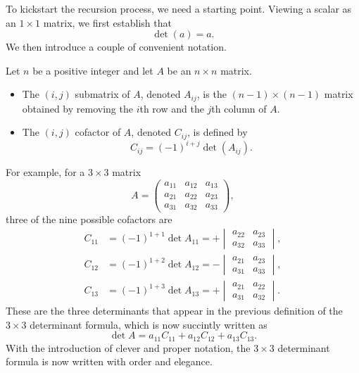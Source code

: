 \documentclass{ximera}
\begin{document}
To kickstart the recursion process, we need a starting point. Viewing
a scalar as an $1 \times 1$ matrix, we first establish that
\[
  \det \left( a \right) = a.
\]
We then introduce a couple of convenient notation.

\begin{definition}
  Let $n$ be a positive integer and let $A$ be an $n \times n$
  matrix.
  \begin{itemize}
  \item The $(i,j)$ submatrix of $A$, denoted $A_{ij}$, is the $(n-1) \times
    (n-1)$ matrix obtained by removing the $i$th row and the $j$th
    column of $A$.
  \item The $(i,j)$ cofactor of $A$, denoted $C_{ij}$, is defined by
    \[
      C_{ij} = (-1)^{i+j} \det(A_{ij}).
    \]
  \end{itemize}
\end{definition}

For example, for a $3 \times 3$ matrix
\[
  A =
  \begin{pmatrix}
    a_{11} & a_{12} & a_{13} \\
    a_{21} & a_{22} & a_{23} \\
    a_{31} & a_{32} & a_{33}
  \end{pmatrix},
\]
three of the nine possible cofactors are
\begin{align*}
  C_{11}
  & = (-1)^{1+1} \det A_{11}
    = +
    \begin{vmatrix}
      a_{22} & a_{23} \\ a_{32} & a_{33}
    \end{vmatrix}, \\
  C_{12}
  & = (-1)^{1+2} \det A_{12}
    = -
    \begin{vmatrix}
      a_{21} & a_{23} \\ a_{31} & a_{33}
    \end{vmatrix}, \\
  C_{13}
  & = (-1)^{1+3} \det A_{13}
    = +
    \begin{vmatrix}
      a_{21} & a_{22} \\ a_{31} & a_{32}
    \end{vmatrix}.
\end{align*}
These are the three determinants that appear in the previous
definition of the $3 \times 3$ determinant formula, which is now succintly
written as
\[
  \det A = a_{11} C_{11} + a_{12} C_{12} + a_{13} C_{13}.
\]
With the introduction of clever and proper notation, the $3 \times 3$
determinant formula is now written with order and elegance.
\end{document}
